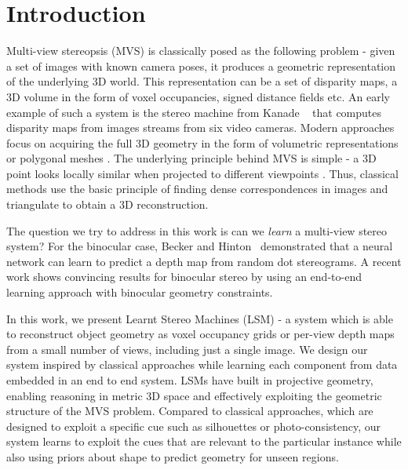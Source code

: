 \documentclass[../thesis.tex]{subfiles}
\begin{document}
%

\section{Introduction}

Multi-view stereopsis (MVS) is classically posed as the following problem - given a set of images with known camera poses, it produces a geometric representation of the underlying 3D world. This representation can be a set of disparity maps, a 3D volume in the form of voxel occupancies, signed distance fields etc. An early example of such a system is the stereo machine from Kanade \etal ~\cite{kanade1995development} that computes disparity maps from images streams from six video cameras. Modern approaches focus on acquiring the full 3D geometry in the form of volumetric representations or polygonal meshes \cite{seitz2006comparison}. The underlying principle behind MVS is simple - a 3D point looks locally similar when projected to different viewpoints \cite{kutulakos2000theory}. Thus, classical methods use the basic principle of finding dense correspondences in images and triangulate to obtain a 3D reconstruction.


The question we try to address in this work is can we \textit{learn} a multi-view stereo system? For the binocular case, Becker and Hinton~\cite{becker1992self} demonstrated that a neural network can learn to predict a depth map from random dot stereograms. A recent work \cite{kendall2017end} shows convincing results for binocular stereo by using an end-to-end learning approach with binocular geometry constraints.

In this work, we present Learnt Stereo Machines (LSM) - a system which is able to reconstruct object geometry as voxel occupancy grids or per-view depth maps from a small number of views, including just a single image. We design our system inspired by classical approaches while learning each component from data embedded in an end to end system. LSMs have built in projective geometry, enabling reasoning in metric 3D space and effectively exploiting the geometric structure of the MVS problem. Compared to classical approaches, which are designed to exploit a specific cue such as silhouettes or photo-consistency, our system learns to exploit the cues that are relevant to the particular instance while also using priors about shape to predict geometry for unseen regions.
\end{document}
